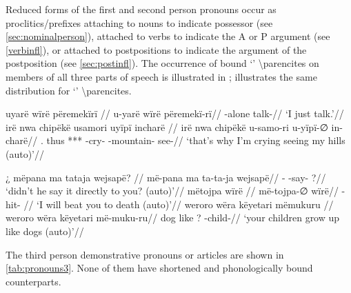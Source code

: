 \documentclass{memoir}
\begin{document}
Reduced forms of the first and second person pronouns occur as
proclitics/prefixes attaching to nouns to indicate possessor (see
\cref{sec:nominalperson}), attached to verbs to indicate the A or P
argument (see \cref{verbinfl}), or attached to postpositions to indicate
the argument of the postposition (see \cref{sec:postinfl}). The
occurrence of bound  `' \textbackslash parencites on
members of all three parts of speech is illustrated in
;  illustrates the same distribution
for  `' \textbackslash parencites.

\pex\label{1marking}    \a     \label{convrisamaj-46}        \begingl
        \glpreamble uyarë wïrë përemekïrï //
        \gla u-yarë wïrë përemekï-rï//
        \glb {}-alone  talk-//
            \glft ‘I just talk.’//  
        \endgl 
    \a     \label{histyarirdi-723}        \begingl
        \glpreamble irë nwa chipëkë usamori uyïpï incharë //
        \gla irë nwa chipëkë u-samo-ri u-yïpï-∅ in-charë//
        \glb {}. thus *** -cry- -mountain- see-//
            \glft ‘that's why I'm crying seeing my hills (auto)’//  
        \endgl 
\xe

\pex\label{2marking}    \a     \label{ctovarmafl-443}        \begingl
        \glpreamble ¿ mëpana ma tataja wejsapë? //
        \gla më-pana ma ta-ta-ja wejsapë//
        \glb {}-  -say- ?//
            \glft ‘didn't he say it directly to you? (auto)’//  
        \endgl 
    \a     \label{histpajirdi-114}        \begingl
        \glpreamble mëtojpa wïrë //
        \gla më-tojpa-∅ wïrë//
        \glb {}-hit- //
            \glft ‘I will beat you to death (auto)’//  
        \endgl 
    \a     \label{histyarirdi-160}        \begingl
        \glpreamble weroro wëra këyetari mëmukuru //
        \gla weroro wëra këyetari më-muku-ru//
        \glb dog like ? -child-//
            \glft ‘your children grow up like dogs (auto)’//  
        \endgl 
\xe

The third person demonstrative pronouns or articles are shown in
\cref{tab:pronouns3}. None of them have shortened and phonologically
bound counterparts.
\end{document}
